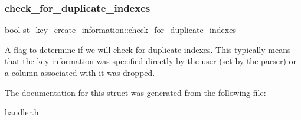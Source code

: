 \subsubsection{\texorpdfstring{check\+\_\+for\+\_\+duplicate\+\_\+indexes}{check\_for\_duplicate\_indexes}}
{\footnotesize\ttfamily bool st\+\_\+key\+\_\+create\+\_\+information\+::check\+\_\+for\+\_\+duplicate\+\_\+indexes}

A flag to determine if we will check for duplicate indexes. This typically means that the key information was specified directly by the user (set by the parser) or a column associated with it was dropped. 

The documentation for this struct was generated from the following file\+:\begin{DoxyCompactItemize}
\item 
handler.\+h\end{DoxyCompactItemize}
